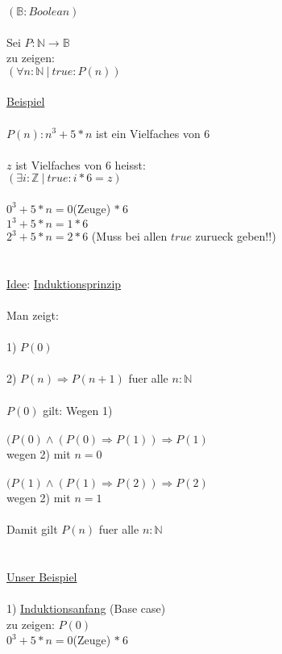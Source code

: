 \documentclass[18pt,a4paper]{article}
\newcommand{\tab}{\hspace*{2em}}
\begin{document}
$(\mathbb{B}: Boolean)$\\
\\
Sei $P : \mathbb{N} \rightarrow \mathbb{B}$\\
zu zeigen:\\
$(\forall{n} : \mathbb{N} \:\vert\: true : P(n) )$\\
\\
\uline{Beispiel}\\
\\
$P(n): n^3 + 5*n$ ist ein Vielfaches von $6$\\
\\
$z$ ist Vielfaches von $6$ heisst:\\
$(\exists{i} : \mathbb{Z} \:\vert\: true : i*6  = z)$\\
\\
$0^3 + 5*n = 0$(Zeuge) $*\:6$\\
$1^3 + 5*n = 1*6$\\
$2^3 + 5*n = 2*6$  (Muss bei allen $true$ zurueck geben!!)\\
\\
\\
\uline{Idee}: \uline{Induktionsprinzip}\\
\\
Man zeigt:\\
\\
1) $P(0)$\\
\\
2) $P(n) \Rightarrow P(n+1)$ fuer alle $n : \mathbb{N}$\\
\\
$P(0)$ gilt: Wegen 1)\\
\\
$(P(0) \wedge (P(0) \Rightarrow P(1)) \Rightarrow P(1)$\\
\tab wegen 2) mit $n=0$\\
\\
$(P(1) \wedge (P(1) \Rightarrow P(2)) \Rightarrow P(2)$\\
\tab wegen 2) mit $n=1$\\
\\
Damit gilt $P(n)$ fuer alle $n:\mathbb{N}$\\
\\
\\
\uline{Unser Beispiel}\\
\\
1) \uline{Induktionsanfang} (Base case)\\
zu zeigen: $P(0)$\\
$0^3 + 5*n = 0$(Zeuge) $*\:6$\\
\end{document}
